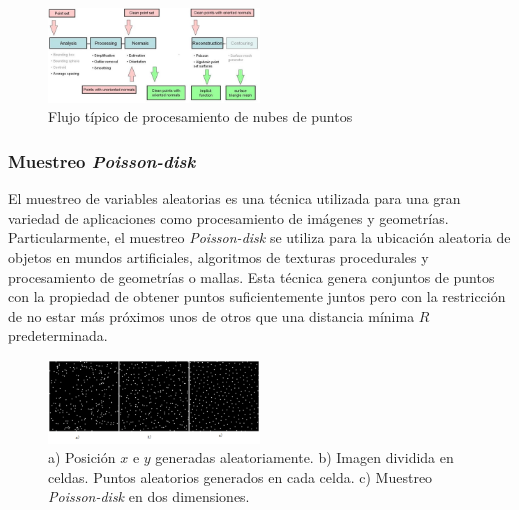 \begin{figure}[H]
  \centering
    \includegraphics[width=0.5\textwidth]{./Cap2_videomapping/malla-flow.png}
  \caption{Flujo típico de procesamiento de nubes de puntos \cite{CGAL}}
  \label{fig:Mesh-CGAL}
\end{figure}

\subsubsection{Muestreo \emph{Poisson-disk}}

El muestreo de variables aleatorias es una técnica utilizada para una gran variedad de aplicaciones como procesamiento de imágenes y geometrías. Particularmente, el muestreo \emph{Poisson-disk} se utiliza para la ubicación aleatoria de objetos en mundos artificiales, algoritmos de texturas procedurales y procesamiento de geometrías o mallas.%
Esta técnica genera conjuntos de puntos con la propiedad de obtener puntos suficientemente juntos pero con la restricción de no estar más próximos unos de otros que una distancia mínima $R$ predeterminada.

\begin{figure}[H]
  \centering
    \includegraphics[width=0.5\textwidth]{./Cap2_videomapping/malla-poisson.png}
  \caption{a) Posición $x$ e $y$ generadas aleatoriamente. b) Imagen dividida en celdas. Puntos aleatorios generados en cada celda. c) Muestreo \emph{Poisson-disk} en dos dimensiones.}
  \label{fig:Mesh-Poisson}
\end{figure}

